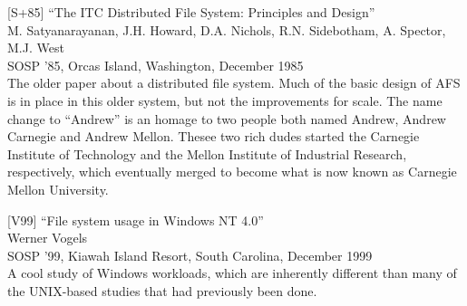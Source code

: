 {[}S+85{]} ``The ITC Distributed File System: Principles and Design''\\
M. Satyanarayanan, J.H. Howard, D.A. Nichols, R.N. Sidebotham, A.
Spector, M.J. West\\
SOSP '85, Orcas Island, Washington, December 1985\\
The older paper about a distributed file system. Much of the basic
design of AFS is in place in this older system, but not the improvements
for scale. The name change to ``Andrew'' is an homage to two people both
named Andrew, Andrew Carnegie and Andrew Mellon. Thesee two rich dudes
started the Carnegie Institute of Technology and the Mellon Institute of
Industrial Research, respectively, which eventually merged to become
what is now known as Carnegie Mellon University.

{[}V99{]} ``File system usage in Windows NT 4.0''\\
Werner Vogels\\
SOSP '99, Kiawah Island Resort, South Carolina, December 1999\\
A cool study of Windows workloads, which are inherently different than
many of the UNIX-based studies that had previously been done.

\newpage
